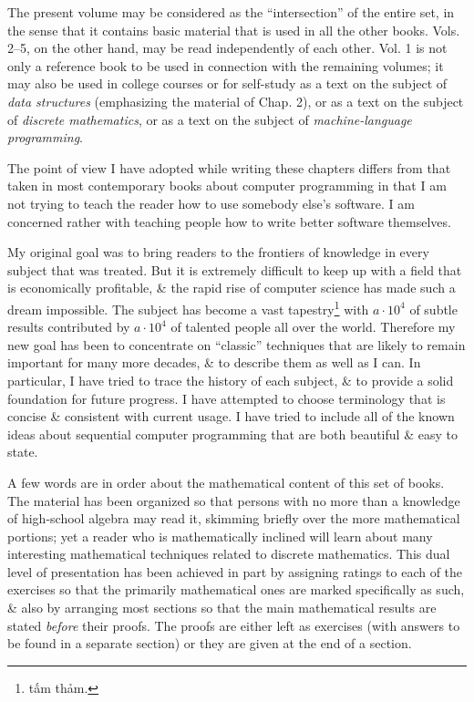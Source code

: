 \documentclass{article}
\begin{document}
The present volume may be considered as the ``intersection'' of the entire set, in the sense that it contains basic material that is used in all the other books. Vols. 2--5, on the other hand, may be read independently of each other. Vol. 1 is not only a reference book to be used in connection with the remaining volumes; it may also be used in college courses or for self-study as a text on the subject of {\it data structures} (emphasizing the material of Chap. 2), or as a text on the subject of {\it discrete mathematics}, or as a text on the subject of {\it machine-language programming}.

The point of view I have adopted while writing these chapters differs from that taken in most contemporary books about computer programming in that I am not trying to teach the reader how to use somebody else's software. I am concerned rather with teaching people how to write better software themselves.

My original goal was to bring readers to the frontiers of knowledge in every subject that was treated. But it is extremely difficult to keep up with a field that is economically profitable, \& the rapid rise of computer science has made such a dream impossible. The subject has become a vast tapestry\footnote{tấm thảm.} with $a\cdot10^4$ of subtle results contributed by $a\cdot10^4$ of talented people all over the world. Therefore my new goal has been to concentrate on ``classic'' techniques that are likely to remain important for many more decades, \& to describe them as well as I can. In particular, I have tried to trace the history of each subject, \& to provide a solid foundation for future progress. I have attempted to choose terminology that is concise \& consistent with current usage. I have tried to include all of the known ideas about sequential computer programming that are both beautiful \& easy to state.

A few words are in order about the mathematical content of this set of books. The material has been organized so that persons with no more than a knowledge of high-school algebra may read it, skimming briefly over the more mathematical portions; yet a reader who is mathematically inclined will learn about many interesting mathematical techniques related to discrete mathematics. This dual level of presentation has been achieved in part by assigning ratings to each of the exercises so that the primarily mathematical ones are marked specifically as such, \& also by arranging most sections so that the main mathematical results are stated {\it before} their proofs. The proofs are either left as exercises (with answers to be found in a separate section) or they are given at the end of a section.
\end{document}
